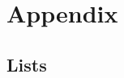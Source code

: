 \documentclass  [
  paper    = a4,
  BCOR     = 10mm,
  DIV      = 14,
  twoside,
  fontsize = 11pt,
  toc      = bibnumbered,
  toc      = listofnumbered,
  numbers  = noendperiod,
  headings = big,
  listof   = leveldown,
	chapterprefix = true,  %
	headsepline   = true,  %
  version  = 3.03
]{scrbook}
\begin{document}


	\begin{spacing}{1}
	  \cleardoublepage
	  
	\end{spacing}

  \cleardoublepage
  \tableofcontents

  \cleardoublepage
  
  
  

	\part*{Appendix}

	\appendix
	
	\chapter{Lists}
	\listoffigures
	\listoftables

	\printbibliography

	\cleardoublepage
	
\end{document}
